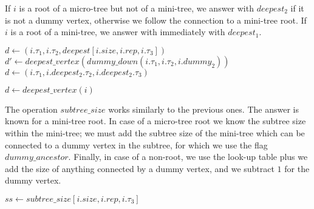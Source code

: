 If $i$ is a root of a micro-tree but not of a mini-tree, we answer with $deepest_2$ if it is not a dummy vertex, otherwise we follow the connection to a mini-tree root.
If $i$ is a root of a mini-tree, we answer with immediately with $deepest_1$.

\begin{algorithmic}
		\State $d \gets (i.\tau_1, i.\tau_2, deepest[i.size, i.rep, i.\tau_3])$
			\State $d' \gets deepest\_vertex(dummy\_down(i.\tau_1, i.\tau_2, i.dummy_2))$
				\State {}
			\Else
				\State {}
			\EndIf
		\Else
			\State {}
		\EndIf
		\State $d \gets (i.\tau_1, i.deepest_2.\tau_2, i.deepest_2.\tau_3)$
			\State {}
		\Else
		\EndIf
	\Else
		\State {}
	\EndIf
\EndFunction
\end{algorithmic}

\begin{algorithmic}
	\State $d \gets deepest\_vertex(i)$
	\State {}
\EndFunction
\end{algorithmic}

The operation $subtree\_size$ works similarly to the previous ones.
The answer is known for a mini-tree root.
In case of a micro-tree root we know the subtree size within the mini-tree; we must add the subtree size of the mini-tree which can be connected to a dummy vertex in the subtree, for which we use the flag $dummy\_ancestor$.
Finally, in case of a non-root, we use the look-up table plus we add the size of anything connected by a dummy vertex, and we subtract $1$ for the dummy vertex.

\begin{algorithmic}
		\State $ss \gets subtree\_size[i.size, i.rep, i.\tau_3]$
			\State {}
		\Else
			\State {}
		\EndIf
			\State {}
		\Else
			\State {}
		\EndIf
	\Else
		\State {}
	\EndIf
\EndFunction
\end{algorithmic}

